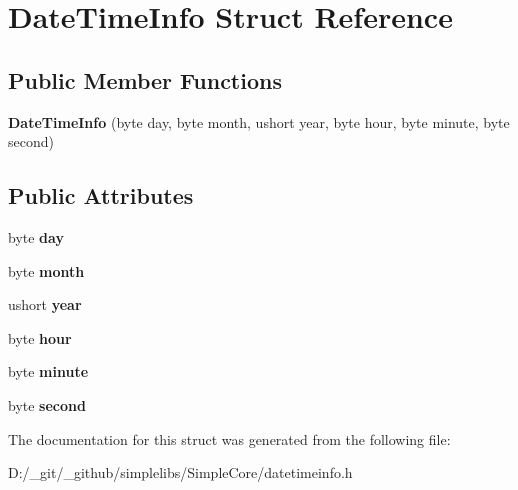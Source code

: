 \hypertarget{struct_date_time_info}{}\section{Date\+Time\+Info Struct Reference}
\label{struct_date_time_info}
\subsection*{Public Member Functions}
\begin{DoxyCompactItemize}
\item 
\mbox{\label{struct_date_time_info_a435a39ef9ed570002b749682b56a3488}} 
{\bfseries Date\+Time\+Info} (byte day, byte month, ushort year, byte hour, byte minute, byte second)
\end{DoxyCompactItemize}
\subsection*{Public Attributes}
\begin{DoxyCompactItemize}
\item 
\mbox{\label{struct_date_time_info_a4ff9b3484f1fa18a4817950b728e70b8}} 
byte {\bfseries day}
\item 
\mbox{\label{struct_date_time_info_a3109dfcfba10cf250aef5c9cee9a2567}} 
byte {\bfseries month}
\item 
\mbox{\label{struct_date_time_info_aa443b266afa7ee36f2b830bb6eeb7582}} 
ushort {\bfseries year}
\item 
\mbox{\label{struct_date_time_info_a0a39e126f724ba5eec16a05b00b68a30}} 
byte {\bfseries hour}
\item 
\mbox{\label{struct_date_time_info_a9cf861937714a5b34d7bf574e0c33636}} 
byte {\bfseries minute}
\item 
\mbox{\label{struct_date_time_info_a768d1180a0b5d2fca5a8cc5cce822a5e}} 
byte {\bfseries second}
\end{DoxyCompactItemize}


The documentation for this struct was generated from the following file\+:\begin{DoxyCompactItemize}
\item 
D\+:/\+\_\+git/\+\_\+github/simplelibs/\+Simple\+Core/datetimeinfo.\+h\end{DoxyCompactItemize}
